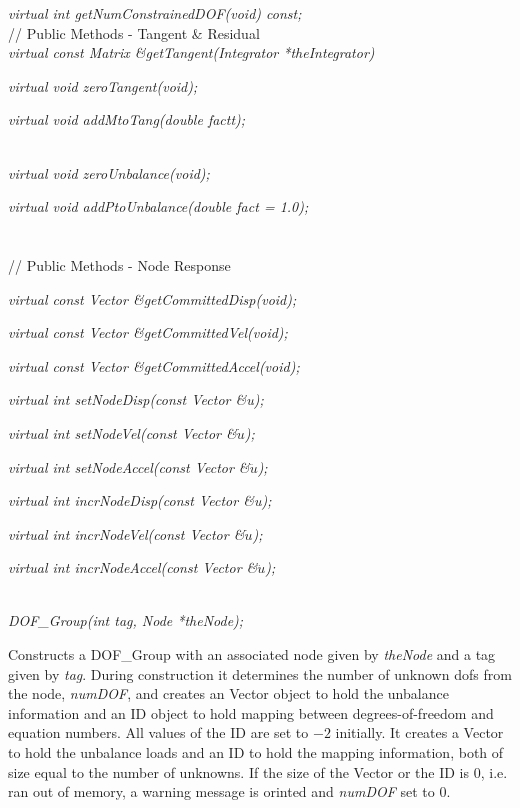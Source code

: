 {\em virtual int getNumConstrainedDOF(void) const;}\\ 

\indent // Public Methods - Tangent \& Residual  \\ 
{\em virtual const Matrix \&getTangent(Integrator *theIntegrator)} 

{\em virtual void zeroTangent(void);}

{\em virtual void addMtoTang(double factt);}

\\ 
{\em virtual void zeroUnbalance(void);}

{\em virtual void  addPtoUnbalance(double fact = 1.0);} \\ 

\\ \\ 
// Public Methods - Node Response  

{\em virtual const Vector \&getCommittedDisp(void);} 

{\em virtual const Vector \&getCommittedVel(void);} 

{\em virtual const Vector \&getCommittedAccel(void);} 

{\em virtual int setNodeDisp(const Vector \&u);} 

{\em virtual int setNodeVel(const Vector \&$\dot u$);}

{\em virtual int setNodeAccel(const Vector \&$\ddot u$);}

{\em virtual int incrNodeDisp(const Vector \&u);} 

{\em virtual int incrNodeVel(const Vector \&$\dot u$);}

{\em virtual int incrNodeAccel(const Vector \&$\ddot u$);}




  \\
{\em DOF\_Group(int tag, Node *theNode);}  

Constructs a  DOF\_Group with an associated node given by {\em
theNode} and a tag given by {\em tag}. During construction it
determines the number of unknown dofs from the node, {\em numDOF}, and
creates an Vector object to hold the unbalance information and an ID
object to hold mapping between degrees-of-freedom and equation
numbers. All values of the ID are set to $-2$ initially. It creates a
Vector to hold the unbalance loads and an ID to 
hold the mapping information, both of size equal to the number of
unknowns. If the size of the Vector or the ID is $0$, i.e. ran out of
memory, a warning message is orinted and {\em numDOF} set to $0$. \\

